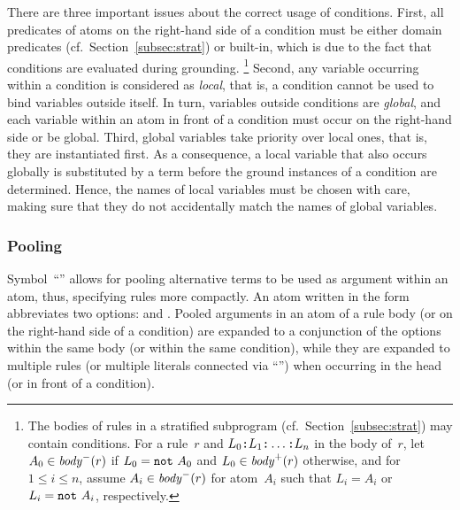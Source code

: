 There are three important issues about the correct usage of conditions.
First, all predicates of atoms on the right-hand side of a condition
must be either domain predicates (cf.\ Section~\ref{subsec:strat}) or built-in,
which is due to the fact that conditions are evaluated during grounding.%
\footnote{%
  The bodies of rules in a stratified subprogram (cf.\ Section~\ref{subsec:strat})
  may contain conditions.
  For a rule~$r$ and
  $L_0\texttt{:}L_1\texttt{:}\dots\texttt{:}L_n$
  in the body of~$r$,
  let $A_0\in\mathit{body}^-(r)$ if $L_0=\texttt{not}~A_0$
  and $L_0\in\mathit{body}^+(r)$ otherwise,
  and for $1\leq i\leq n$, 
  assume $A_i\in\mathit{body}^-(r)$ for atom~$A_i$
  such that $L_i=A_i$ or $L_i=\texttt{not}~A_i$, respectively.
  }
Second, any variable occurring within a condition is considered as \emph{local},
that is, a condition cannot be used to bind variables outside itself.
In turn, variables outside conditions are \emph{global}, and each variable
within an atom in front of a condition must occur on the right-hand side or
be global.
Third, global variables take priority over local ones, that is,
they are instantiated first.
As a consequence, a local variable that also occurs globally is substituted by a term
before the ground instances of a condition are determined.
Hence, the names of local variables must be chosen with care,
making sure that they do not accidentally match the names of global variables.


\subsubsection{Pooling}\label{subsec:gringo:pool}

Symbol~``\code{;}'' allows for pooling alternative terms to be used as
argument within an atom, thus, specifying rules more compactly.
An atom written in the form 
abbreviates two options:
 and .
Pooled arguments in an atom of a rule body 
(or on the right-hand side of a condition) are expanded to a conjunction
of the options within the same body (or within the same condition),
while they are expanded to multiple rules 
(or multiple literals connected via ``\code{,}'')
when occurring in the head (or in front of a condition).

